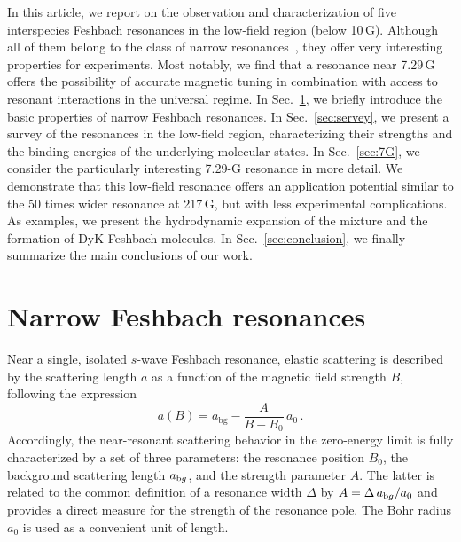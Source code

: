 In this article, we report on the observation and characterization of five interspecies Feshbach resonances in the low-field region (below 10\,G). Although all of them belong to the class of narrow resonances~\cite{Chin2010fri}, they offer very interesting properties for experiments. Most notably, we find that a resonance near 7.29\,G offers the possibility of accurate magnetic tuning in combination with access to resonant interactions in the universal regime. In Sec.~\ref{sec:FRs}, we briefly introduce the basic properties of narrow Feshbach resonances. In Sec.~\ref{sec:servey}, we present a survey of the resonances in the low-field region, characterizing their strengths and the binding energies of the underlying molecular states. In Sec.~\ref{sec:7G}, we consider the particularly interesting 7.29-G resonance in more detail. We demonstrate that this low-field resonance offers an application potential similar to the 50 times wider resonance at 217\,G, but with less experimental complications. As examples, we present the hydrodynamic expansion of the mixture and the formation of DyK Feshbach molecules. In Sec.~\ref{sec:conclusion}, we finally summarize the main conclusions of our work.

\section{Narrow Feshbach resonances}\label{sec:FRs}

Near a single, isolated $s$-wave Feshbach resonance, elastic scattering is described by the scattering length $a$ as a function of the magnetic field strength $B$, following the expression~\cite{Moerdijk1995riu,Chin2010fri}
\begin{equation}
	\label{equ:FeshbachModel}
	a(B) = a_{\textrm{bg}} - \frac{A}{B-B_0} \, a_0 \, .
\end{equation}
Accordingly, the near-resonant scattering behavior in the zero-energy limit is fully characterized by a set of three parameters: the resonance position $B_0$, the background scattering length $a_{\textrm bg}$, and the strength parameter $A$. The latter is related to the common definition of a resonance width $\Delta$ by $A = \Delta \, a_{\textrm bg}/a_0$ and provides a direct measure for the strength of the resonance pole. The Bohr radius $a_0$ is used as a convenient unit of length. 


